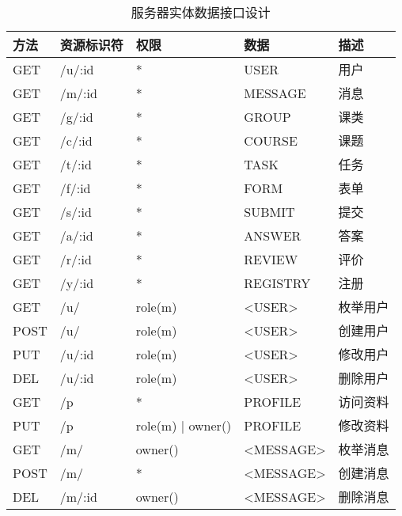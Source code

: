 \noindent
\ttfamily
\begin{longtable}{|p{1.2cm}|p{3cm}|p{3cm}|p{4cm}|X|}

  \caption{服务器实体数据接口设计\label{ServerProtocol}}
  \\
  \hline

  \textbf{方法} & \textbf{资源标识符} & \textbf{权限} & \textbf{数据} & \textbf{描述} \\ \hline

  GET  & /u/:id            & *    & USER         & 用户 \\ \hline
  GET  & /m/:id            & *    & MESSAGE      & 消息 \\ \hline
  GET  & /g/:id            & *    & GROUP        & 课类 \\ \hline
  GET  & /c/:id            & *    & COURSE       & 课题 \\ \hline
  GET  & /t/:id            & *    & TASK         & 任务 \\ \hline
  GET  & /f/:id            & *    & FORM         & 表单 \\ \hline
  GET  & /s/:id            & *    & SUBMIT       & 提交 \\ \hline
  GET  & /a/:id            & *    & ANSWER       & 答案 \\ \hline
  GET  & /r/:id            & *    & REVIEW       & 评价 \\ \hline
  GET  & /y/:id            & *    & REGISTRY     & 注册 \\ \hline

  GET  & /u/    & role(m) & <USER> & 枚举用户 \\ \hline
  POST & /u/    & role(m) & <USER> & 创建用户 \\ \hline
  PUT  & /u/:id & role(m) & <USER> & 修改用户 \\ \hline
  DEL  & /u/:id & role(m) & <USER> & 删除用户 \\ \hline

  GET  & /p     & *                 & PROFILE & 访问资料 \\ \hline
  PUT  & /p     & role(m) | owner() & PROFILE & 修改资料 \\ \hline

  GET  & /m/    & owner() & <MESSAGE> & 枚举消息 \\ \hline
  POST & /m/    & *       & <MESSAGE> & 创建消息 \\ \hline
  DEL  & /m/:id & owner() & <MESSAGE> & 删除消息 \\ \hline


\end{longtable}

